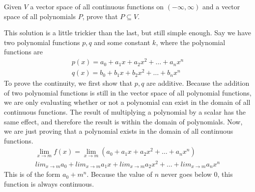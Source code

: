 \begin{exmp}
    Given $V$ a vector space of all continuous functions on $(-\infty ,
    \infty)$ and a vector space of all polynomials $P$, prove that $P
    \subseteq V$.

    This solution is a little trickier than the last, but still simple enough.
    Say we have two polynomial functions $p, q$ and some constant $k$, where the
    polynomial functions are
    \begin{align*}
        p(x) = a_0 + a_1x +a_2x^2 + \hdots + a_nx^n\\
        q(x) = b_0 + b_1x +b_2x^2 + \hdots + b_nx^n
    \end{align*}
    To prove the continuity, we first show that $p, q$ are additive. Because the
    addition of two polynomial functions is still in the vector space of all
    polynomial functions, we are only evaluating whether or not a polynomial can
    exist in the domain of all continuous functions. The result of multiplying a
    polynomial by a scalar has the same effect, and therefore the result is
    within the domain of polynomials. Now, we are just proving that a polynomial
    exists in the domain of all continuous functions.
    \begin{align*}
        \lim_{x \to m} f(x) = \lim_{x \to m} (a_0 + a_1x +a_2x^2 + \hdots +
        a_nx^n)\\
        lim_{x \to m } a_0 
        + lim_{x \to m } a_1x 
        + lim_{x \to m } a_2x^2 
        + \hdots 
        + lim_{x \to m } a_nx^n
    \end{align*}
    This is of the form $a_0 + m^n$. Because the value of $n$ never goes below
    $0$, this function is always continuous.
\end{exmp}
